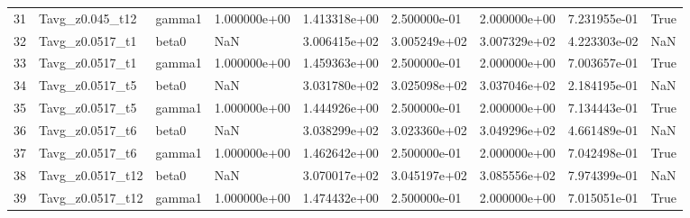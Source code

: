 \begin{tabular}{lllllllll}
31 &   Tavg_z0.045_t12 &    gamma1 & 1.000000e+00 & 1.413318e+00 & 2.500000e-01 & 2.000000e+00 & 7.231955e-01 &    True \\
32 &   Tavg_z0.0517_t1 &     beta0 &          NaN & 3.006415e+02 & 3.005249e+02 & 3.007329e+02 & 4.223303e-02 &     NaN \\
33 &   Tavg_z0.0517_t1 &    gamma1 & 1.000000e+00 & 1.459363e+00 & 2.500000e-01 & 2.000000e+00 & 7.003657e-01 &    True \\
34 &   Tavg_z0.0517_t5 &     beta0 &          NaN & 3.031780e+02 & 3.025098e+02 & 3.037046e+02 & 2.184195e-01 &     NaN \\
35 &   Tavg_z0.0517_t5 &    gamma1 & 1.000000e+00 & 1.444926e+00 & 2.500000e-01 & 2.000000e+00 & 7.134443e-01 &    True \\
36 &   Tavg_z0.0517_t6 &     beta0 &          NaN & 3.038299e+02 & 3.023360e+02 & 3.049296e+02 & 4.661489e-01 &     NaN \\
37 &   Tavg_z0.0517_t6 &    gamma1 & 1.000000e+00 & 1.462642e+00 & 2.500000e-01 & 2.000000e+00 & 7.042498e-01 &    True \\
38 &  Tavg_z0.0517_t12 &     beta0 &          NaN & 3.070017e+02 & 3.045197e+02 & 3.085556e+02 & 7.974399e-01 &     NaN \\
39 &  Tavg_z0.0517_t12 &    gamma1 & 1.000000e+00 & 1.474432e+00 & 2.500000e-01 & 2.000000e+00 & 7.015051e-01 &    True \\
\bottomrule
\end{tabular}
